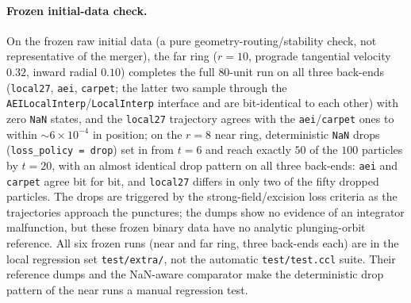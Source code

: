 \documentclass[11pt]{article}
\begin{document}
\paragraph{Frozen initial-data check.}
On the frozen raw initial data (a pure geometry-routing/stability check, not
representative of the merger), the far ring ($r = 10$, prograde tangential
velocity $0.32$, inward radial $0.10$) completes the full $80$-unit run on all
three back-ends (\texttt{local27}, \texttt{aei}, \texttt{carpet}; the latter two
sample through the \texttt{AEILocalInterp}/\texttt{LocalInterp} interface and
are bit-identical to each other) with zero \texttt{NaN} states, and the \texttt{local27}
trajectory agrees with the \texttt{aei}/\texttt{carpet} ones to within
$\sim6\times10^{-4}$ in position; on the $r = 8$ near ring, deterministic
\texttt{NaN} drops (\texttt{loss\_policy = drop}) set in from $t = 6$ and reach
exactly $50$ of the $100$ particles by $t = 20$, with an almost identical drop
pattern on all three back-ends: \texttt{aei} and \texttt{carpet} agree bit for
bit, and \texttt{local27} differs in only two of the fifty dropped particles.
The drops are triggered by the strong-field/excision loss criteria as the
trajectories approach the punctures; the dumps show no evidence of an
integrator malfunction, but these frozen binary data have no analytic
plunging-orbit reference.  All six frozen runs (near and far ring, three
back-ends each) are in the local regression set \texttt{test/extra/}, not the
automatic \texttt{test/test.ccl} suite.  Their reference dumps and the
NaN-aware comparator make the deterministic drop pattern of the near runs a
manual regression test.
\end{document}
